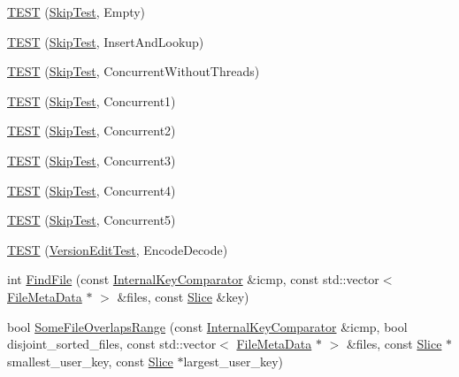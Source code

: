 \begin{DoxyCompactItemize}
\item 
\mbox{\hyperlink{namespaceleveldb_a94b31a20798f6d72a6cd11c328fcaba7}{T\+E\+ST}} (\mbox{\hyperlink{classleveldb_1_1_skip_test}{Skip\+Test}}, Empty)
\item 
\mbox{\hyperlink{namespaceleveldb_a21e74b2de9a6f3db48c8d3ff277a1e0d}{T\+E\+ST}} (\mbox{\hyperlink{classleveldb_1_1_skip_test}{Skip\+Test}}, Insert\+And\+Lookup)
\item 
\mbox{\hyperlink{namespaceleveldb_a7a43c7e5a10488ca82072e3cc871fcb2}{T\+E\+ST}} (\mbox{\hyperlink{classleveldb_1_1_skip_test}{Skip\+Test}}, Concurrent\+Without\+Threads)
\item 
\mbox{\hyperlink{namespaceleveldb_a1997f90d2777db110a06646c9a3c7ba2}{T\+E\+ST}} (\mbox{\hyperlink{classleveldb_1_1_skip_test}{Skip\+Test}}, Concurrent1)
\item 
\mbox{\hyperlink{namespaceleveldb_a0ac3fd3bf30e8efdbdead6e963ffbe3d}{T\+E\+ST}} (\mbox{\hyperlink{classleveldb_1_1_skip_test}{Skip\+Test}}, Concurrent2)
\item 
\mbox{\hyperlink{namespaceleveldb_a95f25d807cc1b1a16a34f9a3a24fb7bc}{T\+E\+ST}} (\mbox{\hyperlink{classleveldb_1_1_skip_test}{Skip\+Test}}, Concurrent3)
\item 
\mbox{\hyperlink{namespaceleveldb_a491925bfd0a0eb00edbbbbc0f1d3c0c9}{T\+E\+ST}} (\mbox{\hyperlink{classleveldb_1_1_skip_test}{Skip\+Test}}, Concurrent4)
\item 
\mbox{\hyperlink{namespaceleveldb_ae94270b577d135677ad028bef3170a16}{T\+E\+ST}} (\mbox{\hyperlink{classleveldb_1_1_skip_test}{Skip\+Test}}, Concurrent5)
\item 
\mbox{\hyperlink{namespaceleveldb_aa3106d7d6e907fc13c8c7ceed76740ad}{T\+E\+ST}} (\mbox{\hyperlink{classleveldb_1_1_version_edit_test}{Version\+Edit\+Test}}, Encode\+Decode)
\item 
int \mbox{\hyperlink{namespaceleveldb_a812c4c6cf8299e767535a59f2205df0c}{Find\+File}} (const \mbox{\hyperlink{classleveldb_1_1_internal_key_comparator}{Internal\+Key\+Comparator}} \&icmp, const std\+::vector$<$ \mbox{\hyperlink{structleveldb_1_1_file_meta_data}{File\+Meta\+Data}} $\ast$ $>$ \&files, const \mbox{\hyperlink{classleveldb_1_1_slice}{Slice}} \&key)
\item 
bool \mbox{\hyperlink{namespaceleveldb_a1a6a370f17b20667b885b5b91159c5a9}{Some\+File\+Overlaps\+Range}} (const \mbox{\hyperlink{classleveldb_1_1_internal_key_comparator}{Internal\+Key\+Comparator}} \&icmp, bool disjoint\+\_\+sorted\+\_\+files, const std\+::vector$<$ \mbox{\hyperlink{structleveldb_1_1_file_meta_data}{File\+Meta\+Data}} $\ast$ $>$ \&files, const \mbox{\hyperlink{classleveldb_1_1_slice}{Slice}} $\ast$smallest\+\_\+user\+\_\+key, const \mbox{\hyperlink{classleveldb_1_1_slice}{Slice}} $\ast$largest\+\_\+user\+\_\+key)

\end{DoxyCompactItemize}
